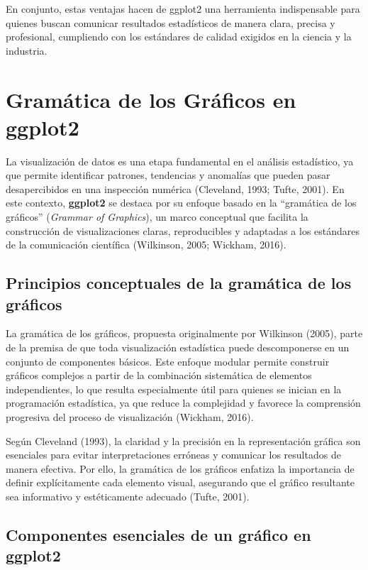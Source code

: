 \documentclass[
  spanish,
  a4paper,
  DIV=11,
  numbers=noendperiod,
  onepage,
  openany]{scrreprt}
\begin{document}
En conjunto, estas ventajas hacen de ggplot2 una herramienta
indispensable para quienes buscan comunicar resultados estadísticos de
manera clara, precisa y profesional, cumpliendo con los estándares de
calidad exigidos en la ciencia y la industria.

\section{Gramática de los Gráficos en
ggplot2}\label{gramuxe1tica-de-los-gruxe1ficos-en-ggplot2}

La visualización de datos es una etapa fundamental en el análisis
estadístico, ya que permite identificar patrones, tendencias y anomalías
que pueden pasar desapercibidos en una inspección numérica (Cleveland,
1993; Tufte, 2001). En este contexto, \textbf{ggplot2} se destaca por su
enfoque basado en la ``gramática de los gráficos'' (\emph{Grammar of
Graphics}), un marco conceptual que facilita la construcción de
visualizaciones claras, reproducibles y adaptadas a los estándares de la
comunicación científica (Wilkinson, 2005; Wickham, 2016).

\subsection{Principios conceptuales de la gramática de los
gráficos}\label{principios-conceptuales-de-la-gramuxe1tica-de-los-gruxe1ficos}

La gramática de los gráficos, propuesta originalmente por Wilkinson
(2005), parte de la premisa de que toda visualización estadística puede
descomponerse en un conjunto de componentes básicos. Este enfoque
modular permite construir gráficos complejos a partir de la combinación
sistemática de elementos independientes, lo que resulta especialmente
útil para quienes se inician en la programación estadística, ya que
reduce la complejidad y favorece la comprensión progresiva del proceso
de visualización (Wickham, 2016).

Según Cleveland (1993), la claridad y la precisión en la representación
gráfica son esenciales para evitar interpretaciones erróneas y comunicar
los resultados de manera efectiva. Por ello, la gramática de los
gráficos enfatiza la importancia de definir explícitamente cada elemento
visual, asegurando que el gráfico resultante sea informativo y
estéticamente adecuado (Tufte, 2001).

\subsection{Componentes esenciales de un gráfico en
ggplot2}\label{componentes-esenciales-de-un-gruxe1fico-en-ggplot2}
\end{document}
